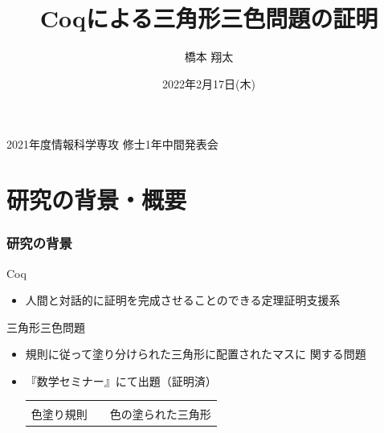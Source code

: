 \documentclass[dvipdfmx,cjk]{beamer}
\begin{document}
\title[Coqによる三角形三色問題の証明]{Coqによる三角形三色問題の証明} 
\author[橋本翔太]{橋本 翔太}
\subject{\footnotesize{2021年度情報科学専攻 修士1年中間発表会}}
\date[2022年2月17日]{2022年2月17日(木)} %

\begin{frame}
  \titlepage
  \begin{center}
    {\small{2021年度情報科学専攻 修士1年中間発表会}}
  \end{center}
\end{frame}

\begin{frame}
  \tableofcontents
\end{frame}

\section{研究の背景・概要}

\large
\begin{frame}
  \frametitle{研究の背景}
  Coq \\
  \begin{itemize}
  \item
    人間と対話的に証明を完成させることのできる定理証明支援系
  \end{itemize}
  \vfill
  三角形三色問題
  \begin{itemize}
    \item
    規則に従って塗り分けられた三角形に配置されたマスに
    関する問題
    \item
      『数学セミナー』にて出題（証明済）
      \vfill
    \begin{center}
      \begin{tabular}{ccc}
        
        &
        \hfill
        &
        
        \\
        色塗り規則
        &
        \hfill
        &
        色の塗られた三角形
      \end{tabular}
    \end{center}
  \end{itemize}
\end{frame}
\end{document}
